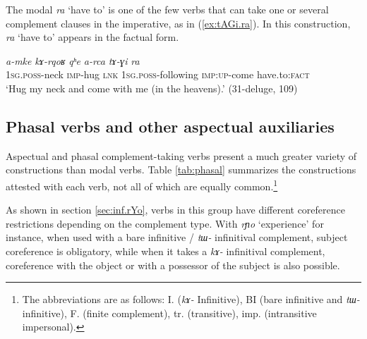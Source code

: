 \documentclass[oneside,a4paper,11pt]{article}
\newcommand{\ipa}[1]{\textit{\phon#1}}
\newcommand{\jpg}[2]{\ipa{#1} `#2'}
\newcommand{\refb}[1]{(\ref{#1})}
\begin{document}
The modal \jpg{ra}{have to}  is one of the few verbs that can take one or several complement clauses in the imperative, as in \refb{ex:tAGi.ra}. In this construction, \jpg{ra}{have to} appears in the factual form.

\begin{exe}
\ex \label{ex:tAGi.ra}
\gll \ipa{a-mke} 	\ipa{kɤ-rqoʁ} 	\ipa{qʰe} 	\ipa{a-rca} 	\ipa{tɤ-ɣi} 	\ipa{ra}  \\
\textsc{1sg.poss}-neck \textsc{imp}-hug \textsc{lnk} \textsc{1sg.poss}-following \textsc{imp:up}-come have.to:\textsc{fact} \\
\glt `Hug my neck and come with me (in the heavens).' (31-deluge, 109)
\end{exe}

  \subsection{Phasal verbs and other aspectual auxiliaries}
Aspectual and phasal complement-taking verbs present a  much greater variety of constructions than modal verbs. Table \ref{tab:phasal} summarizes the constructions attested with each verb, not all of which are equally common.\footnote{The abbreviations are as follows: 	I. (\ipa{kɤ-} Infinitive), BI (bare infinitive and \ipa{tɯ-} infinitive), 	F. (finite complement), tr. (transitive), imp. (intransitive impersonal). }  

As shown in section \ref{sec:inf.rYo}, verbs in this group have different coreference restrictions depending on the complement type. With  \jpg{rɲo}{experience} for instance, when used with a bare infinitive / \ipa{tɯ-} infinitival complement, subject coreference is obligatory, while when it takes a \ipa{kɤ-} infinitival complement, coreference with the object or with a possessor of the subject is also possible.
\end{document}
